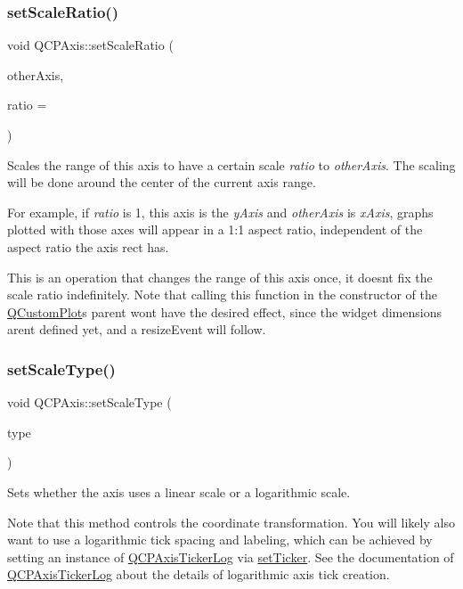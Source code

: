 \subsubsection{\texorpdfstring{set\+Scale\+Ratio()}{setScaleRatio()}}
{\footnotesize\ttfamily void Q\+C\+P\+Axis\+::set\+Scale\+Ratio (\begin{DoxyParamCaption}\item[{const \hyperlink{class_q_c_p_axis}{Q\+C\+P\+Axis} $\ast$}]{other\+Axis,  }\item[{double}]{ratio = {} }\end{DoxyParamCaption})}

Scales the range of this axis to have a certain scale {\itshape ratio} to {\itshape other\+Axis}. The scaling will be done around the center of the current axis range.

For example, if {\itshape ratio} is 1, this axis is the {\itshape y\+Axis} and {\itshape other\+Axis} is {\itshape x\+Axis}, graphs plotted with those axes will appear in a 1\+:1 aspect ratio, independent of the aspect ratio the axis rect has.

This is an operation that changes the range of this axis once, it doesn\textquotesingle{}t fix the scale ratio indefinitely. Note that calling this function in the constructor of the \hyperlink{class_q_custom_plot}{Q\+Custom\+Plot}\textquotesingle{}s parent won\textquotesingle{}t have the desired effect, since the widget dimensions aren\textquotesingle{}t defined yet, and a resize\+Event will follow. \mbox{\label{class_q_c_p_axis_adef29cae617af4f519f6c40d1a866ca6}} 
\subsubsection{\texorpdfstring{set\+Scale\+Type()}{setScaleType()}}
{\footnotesize\ttfamily void Q\+C\+P\+Axis\+::set\+Scale\+Type (\begin{DoxyParamCaption}\item[{\hyperlink{class_q_c_p_axis_a36d8e8658dbaa179bf2aeb973db2d6f0}{Q\+C\+P\+Axis\+::\+Scale\+Type}}]{type }\end{DoxyParamCaption})}

Sets whether the axis uses a linear scale or a logarithmic scale.

Note that this method controls the coordinate transformation. You will likely also want to use a logarithmic tick spacing and labeling, which can be achieved by setting an instance of \hyperlink{class_q_c_p_axis_ticker_log}{Q\+C\+P\+Axis\+Ticker\+Log} via \hyperlink{class_q_c_p_axis_a4ee03fcd2c74d05cd1a419b9af5cfbdc}{set\+Ticker}. See the documentation of \hyperlink{class_q_c_p_axis_ticker_log}{Q\+C\+P\+Axis\+Ticker\+Log} about the details of logarithmic axis tick creation.

